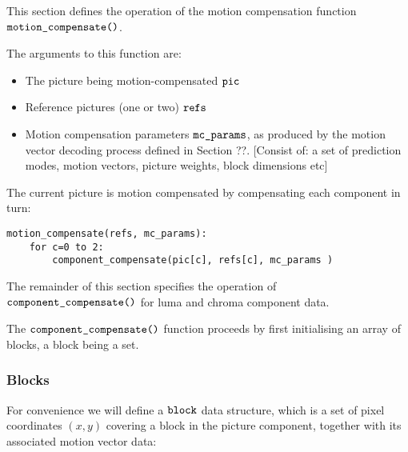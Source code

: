 
This section defines the operation of the motion compensation function
$\text{\texttt{motion\_compensate()}}$.

The arguments to this function are:

\begin{itemize}
    \item The picture being motion-compensated $\text{\texttt{pic}}$
    \item Reference pictures (one or two) $\text{\texttt{refs}}$
    \item Motion compensation parameters $\text{\texttt{mc\_params}}$, as produced by the motion
    vector decoding process defined in Section ??.
[Consist of: a set of prediction modes, motion vectors, picture weights, block dimensions etc]
\end{itemize}

The current picture is motion compensated by compensating each component in turn:

\begin{verbatim}
motion_compensate(refs, mc_params):
    for c=0 to 2:
        component_compensate(pic[c], refs[c], mc_params )
\end{verbatim}

The remainder of this section specifies the operation of $\text{\texttt{component\_compensate()}}$ for luma and
chroma component data.

The $\text{\texttt{component\_compensate()}}$ function proceeds by first initialising an array of blocks,
a block being a set. 

\subsubsection{Blocks}

For convenience we will define a $\text{\texttt{block}}$ data structure, which is a set
of pixel coordinates $(x,y)$ covering a block in the picture component,
together with its associated motion vector data:

